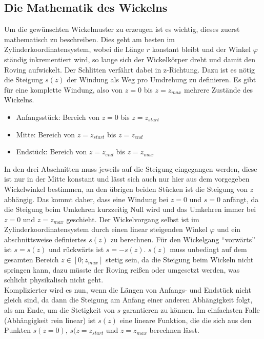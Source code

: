 \documentclass[12pt, a4paper, ngerman]{article}
\begin{document}



\subsection{Die Mathematik des Wickelns}
Um die gewünschten Wickelmuster zu erzeugen ist es wichtig, dieses zuerst mathematisch zu beschreiben. Dies geht am besten im Zylinderkoordinatensystem, wobei die Länge $r$ konstant bleibt und der Winkel $\varphi$ ständig inkrementiert wird, so lange sich der Wickelkörper dreht und damit den Roving aufwickelt. Der Schlitten verfährt dabei in z-Richtung. Dazu ist es nötig die Steigung $s(z)$ der Windung als Weg pro Umdrehung zu definieren. Es gibt für eine komplette Windung, also von $z = 0$ bis $z = z_{max}$ mehrere Zustände des Wickelns.\\
\begin{itemize}
	\item Anfangsstück: Bereich von $z = 0$ bis $z = z_{start}$
	\item Mitte: Bereich von $z = z_{start}$ bis $z = z_{end}$
	\item Endstück: Bereich von $z = z_{end}$ bis $z = z_{max}$
\end{itemize}
In den drei Abschnitten muss jeweils auf die Steigung eingegangen werden, diese ist nur in der Mitte konstant und lässt sich auch nur hier aus dem vorgegeben Wickelwinkel bestimmen, an den übrigen beiden Stücken ist die Steigung von $z$ abhängig. Das kommt daher, dass eine Windung bei $z = 0$ und $s = 0$ anfängt, da die Steigung beim Umkehren kurzzeitig Null wird und das Umkehren immer bei $z = 0$ und $z = z_{max}$ geschieht. Der Wickelvorgang selbst ist im Zylinderkoordinatensystem durch einen linear steigenden Winkel $\varphi$ und ein abschnittsweise definiertes $s(z)$ zu berechnen. Für den Wickelgang \enquote{vorwärts} ist $s = s(z)$ und rückwärts ist $s = -s(z)$. $s(z)$ muss unbedingt auf dem gesamten Bereich $z \in [0; z_{max}]$ stetig sein, da die Steigung beim Wickeln nicht springen kann, dazu müsste der Roving reißen oder umgesetzt werden, was schlicht physikalisch nicht geht.\\
Komplizierter wird es nun, wenn die Längen von Anfangs- und Endstück nicht gleich sind, da dann die Steigung am Anfang einer anderen Abhängigkeit folgt, als am Ende, um die Stetigkeit von $s$ garantieren zu können. Im einfachsten Falle (Abhängigkeit rein linear) ist $s(z)$ eine lineare Funktion, die die sich aus den Punkten $s(z = 0)$, $s(z = z_{start}$ und $z = z_{max}$ berechnen lässt.\\
\end{document}
